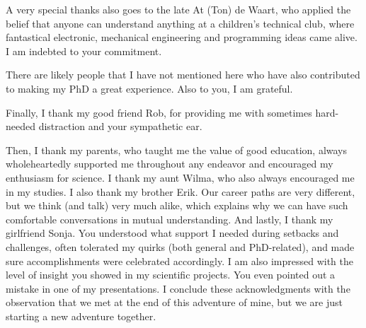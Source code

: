 
A very special thanks also goes to the late At (Ton) de Waart,
who applied the belief that anyone can understand anything 
at a children's technical club, 
where fantastical electronic, mechanical engineering and programming ideas came alive.
I am indebted to your commitment. 



There are likely people that I have not mentioned here
who have also contributed to making my PhD a great experience.
Also to you, I am grateful.


Finally, I thank my good friend Rob, for providing me with sometimes hard-needed distraction 
and your sympathetic ear.

Then, 
I thank my parents, 
who taught me the value of good education, 
always wholeheartedly supported me throughout any endeavor 
and encouraged my enthusiasm for science.
%
I thank my aunt Wilma, who also always encouraged me in my studies. 
%
I also thank my brother Erik.
Our career paths are very different, 
but we think (and talk) very much alike, 
which explains why we can have such comfortable conversations 
in mutual understanding. 
%
And lastly, I thank my girlfriend Sonja.
You understood what support I needed during setbacks and challenges,
often tolerated my quirks (both general and PhD-related),
and made sure accomplishments were celebrated accordingly. 
I am also impressed with the level of insight you showed in my scientific projects. 
You even pointed out a mistake in one of my presentations.
%
I conclude these acknowledgments with the observation that 
we met at the end of this adventure of mine,
but we are just starting a new adventure together.




























